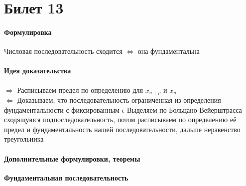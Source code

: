 \documentclass[a4paper,10pt]{article}
\begin{document}
	\section{Билет 13}
	\begin{center} 
		\item \paragraph{Формулировка} 
	\end{center}
	Числовая последовательность сходится $\Leftrightarrow$ она фундаментальна
	\begin{center} 
		\item \paragraph{Идея доказательства} 
	\end{center}
	$\Rightarrow$ Расписываем предел по определению для $x_{n+p}$ и $x_{n}$ \\
	$\Leftarrow$ Доказываем, что последовательность ограниченная из определения фундаментальности с фиксированным $\epsilon$
	Выделяем по Больцано-Вейерштрасса сходящуюся подпоследовательность, потом расписываем по определению её предел и фундаментальность нашей последовательности, дальше неравенство треугольника
	\begin{center} 
		\item \paragraph{Дополнительные формулировки, теоремы} 
	\end{center}
	\textbf{Фундаментальная последовательность}
\end{document}
